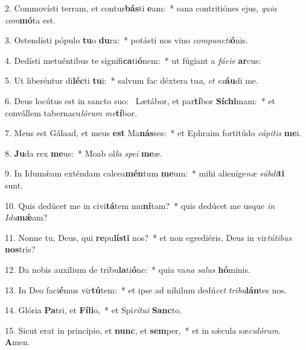 2. Commovísti terram, et contur\textbf{bás}ti \textbf{e}am:~*  sana contritiónes ejus, \textit{qui}\textit{a} \textit{com}\textbf{mó}ta est.\

3. Ostendísti pópulo \textbf{tu}o \textbf{du}ra:~*  potásti nos vino \textit{com}\textit{punc}\textit{ti}\textbf{ó}nis.\

4. Dedísti metuéntibus te signifi\textbf{ca}ti\textbf{ó}nem:~*  ut fúgiant a \textit{fá}\textit{ci}\textit{e} \textbf{ar}cus:\

5. Ut liberéntur di\textbf{léc}ti \textbf{tu}i:~*  salvum fac déxtera tu\textit{a}, \textit{et} \textit{ex}\textbf{áu}di me.\

6. Deus locútus est in sancto suo: \dag\  Lætábor, et par\textbf{tí}bor \textbf{Sí}\textbf{chi}mam:~*  et convállem tabernacu\textit{ló}\textit{rum} \textit{me}\textbf{tí}bor.\

7. Meus est Gálaad, et meus \textbf{est} Ma\textbf{nás}ses:~*  et Ephraim fortitúdo \textit{cá}\textit{pi}\textit{tis} \textbf{me}i.\

8. \textbf{Ju}da rex \textbf{me}us:~*  Moab ol\textit{la} \textit{spe}\textit{i} \textbf{me}æ.\

9. In Idumǽam exténdam calcea\textbf{mén}tum \textbf{me}um:~*  mihi alieníge\textit{næ} \textit{súb}\textit{di}\textbf{ti} sunt.\

10. Quis dedúcet me in civi\textbf{tá}tem mu\textbf{ní}tam?~*  quis dedúcet me usque \textit{in} \textit{I}\textit{du}\textbf{mǽ}am?\

11. Nonne tu, Deus, qui \textbf{re}pu\textbf{lís}\textbf{ti} nos?~*  et non egrediéris, Deus in vir\textit{tú}\textit{ti}\textit{bus} \textbf{nos}tris?\

12. Da nobis auxílium de tribu\textbf{la}ti\textbf{ó}ne:~*  quia va\textit{na} \textit{sa}\textit{lus} \textbf{hó}minis.\

13. In Deo faci\textbf{é}mus vir\textbf{tú}tem:~*  et ipse ad níhilum dedú\textit{cet} \textit{tri}\textit{bu}\textbf{lán}tes nos.\

14. Glória \textbf{Pa}tri, et \textbf{Fí}\textbf{li}o,~*  et Spi\textit{rí}\textit{tu}\textit{i} \textbf{Sanc}to.\

15. Sicut erat in princípio, et \textbf{nunc}, et \textbf{sem}per,~*  et in sǽcula sæ\textit{cu}\textit{ló}\textit{rum}. \textbf{A}men.\

